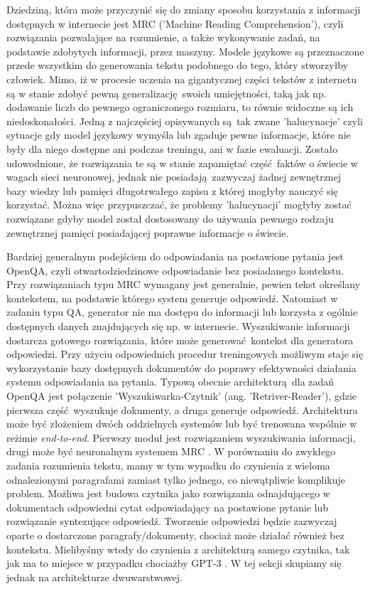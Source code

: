 Dziedziną, która może przyczynić się do zmiany sposobu korzystania z informacji dostępnych w internecie jest MRC ('Machine Reading Comprehension'), czyli rozwiązania pozwalające na rozumienie, a także wykonywanie zadań, na podstawie zdobytych informacji, przez maszyny. Modele językowe są przeznaczone przede wszystkim do generowania tekstu podobnego do tego, który stworzyłby człowiek. Mimo, iż w procesie uczenia na gigantycznej części tekstów z internetu są w stanie zdobyć pewną generalizację swoich umiejętności, taką jak np. dodawanie liczb do pewnego ograniczonego rozmiaru, to równie widoczne są ich niedoskonałości. Jedną z najczęściej opisywanych są tak zwane 'halucynacje' czyli sytuacje gdy model językowy wymyśla lub zgaduje pewne informacje, które nie były dla niego dostępne ani podczas treningu, ani w fazie ewaluacji. Zostało udowodnione, że rozwiązania te są w stanie zapamiętać część faktów o świecie w wagach sieci neuronowej, jednak nie posiadają zazwyczaj żadnej zewnętrznej bazy wiedzy lub pamięci długotrwałego zapisu z której mogłyby nauczyć się korzystać. Można więc przypuszczać, że problemy 'halucynacji' mogłyby zostać rozwiązane gdyby model został dostosowany do używania pewnego rodzaju zewnętrznej pamięci posiadającej poprawne informacje o świecie.\newline

Bardziej generalnym podejściem do odpowiadania na postawione pytania jest OpenQA, czyli otwartodziedzinowe odpowiadanie bez posiadanego kontekstu. Przy rozwiązaniach typu MRC wymagany jest generalnie, pewien tekst określany kontekstem, na podstawie którego system generuje odpowiedź. Natomiast w zadaniu typu QA, generator nie ma dostępu do informacji lub korzysta z ogólnie dostępnych danych znajdujących się np. w internecie. Wyszukiwanie informacji dostarcza gotowego rozwiązania, które może generować kontekst dla generatora odpowiedzi. Przy użyciu odpowiednich procedur treningowych możliwym staje się wykorzystanie bazy dostępnych dokumentów do poprawy efektywności działania systemu odpowiadania na pytania. Typową obecnie architekturą dla zadań OpenQA jest połączenie 'Wyszukiwarka-Czytnik' (ang. 'Retriver-Reader'), gdzie pierwsza część wyszukuje dokumenty, a druga generuje odpowiedź. Architektura może być złożeniem dwóch oddzielnych systemów lub być trenowana wspólnie w reżimie \emph{end-to-end}. Pierwszy moduł jest rozwiązaniem wyszukiwania informacji, drugi może być neuronalnym systemem MRC \autocite{zhu2021retrieving}. W porównaniu do zwykłego zadania rozumienia tekstu, mamy w tym wypadku do czynienia z wieloma odnalezionymi paragrafami zamiast tylko jednego, co niewątpliwie komplikuje problem. Możliwa jest budowa czytnika jako rozwiązania odnajdującego w dokumentach odpowiedni cytat odpowiadający na postawione pytanie lub rozwiązanie syntezujące odpowiedź. Tworzenie odpowiedzi będzie zazwyczaj oparte o dostarczone paragrafy/dokumenty, chociaż może działać również bez kontekstu. Mielibyśmy wtedy do czynienia z architekturą samego czytnika, tak jak ma to miejsce w przypadku chociażby GPT-3 \autocite{zhu2021retrieving}. W tej sekcji skupiamy się jednak na architekturze dwuwarstwowej.
 
